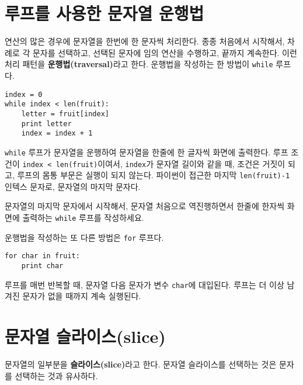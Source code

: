\section{    루프를 사용한 문자열 운행법}
\label{for}


연산의 많은 경우에 문자열을 한번에 한 문자씩 처리한다. 
종종 처음에서 시작해서, 차례로 각 문자를 선택하고, 선택된 문자에 임의 연산을 수행하고, 끝까지 계속한다. 
이런 처리 패턴을 {\bf 운행법(traversal)}라고 한다.
운행법을 작성하는 한 방법이 {\tt while} 루프다.

\beforeverb
\begin{verbatim}
index = 0
while index < len(fruit):
    letter = fruit[index]
    print letter
    index = index + 1
\end{verbatim}
\afterverb
%

{\tt while} 루프가 문자열을 운행하여 문자열을 한줄에 한 글자씩 화면에 출력한다.
루프 조건이 {\tt index < len(fruit)}이여서, {\tt index}가 문자열 길이와 같을 때,
조건은 거짓이 되고, 루프의 몸통 부문은 실행이 되지 않는다. 
파이썬이 접근한 마지막 {\tt len(fruit)-1} 인텍스 문자로, 문자열의 마지막 문자다.

\begin{ex}
문자열의 마지막 문자에서 시작해서, 문자열 처음으로 역진행하면서 한줄에 한자씩 화면에 출력하는 {\tt while} 루프를 작성하세요.
\end{ex}

운행법을 작성하는 또 다른 방법은 {\tt for} 루프다.

\beforeverb
\begin{verbatim}
for char in fruit:
    print char
\end{verbatim}
\afterverb
%

루프를 매번 반복할 때, 문자열 다음 문자가 변수 {\tt char}에 대입된다. 
루프는 더 이상 남겨진 문자가 없을 때까지 계속 실행된다.

\section{    문자열 슬라이스(slice)}
\label{slice}


문자열의 일부분을 {\bf 슬라이스(slice)}라고 한다. 
문자열 슬라이스를 선택하는 것은 문자를 선택하는 것과 유사하다.

